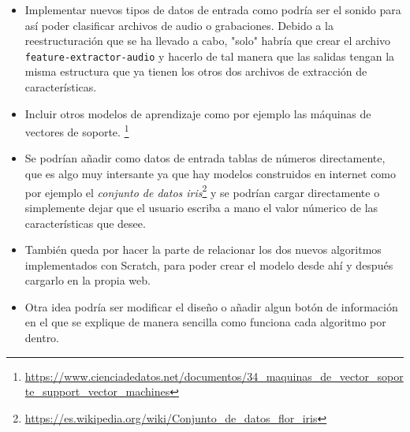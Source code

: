 \documentclass[a4paper, 12pt]{book}
\begin{document}
\begin{itemize}
  	\item  Implementar nuevos tipos de datos de entrada como podría ser el sonido para así poder clasificar archivos de audio o grabaciones. Debido a la reestructuración que se ha llevado a cabo, "solo" habría que crear el archivo \texttt{feature-extractor-audio} y hacerlo de tal manera que las salidas tengan la misma estructura que ya tienen los otros dos archivos de extracción de características.

	\item Incluir otros modelos de aprendizaje como por ejemplo las máquinas de vectores de soporte. \footnote{\url{https://www.cienciadedatos.net/documentos/34_maquinas_de_vector_soporte_support_vector_machines}}

	\item Se podrían añadir como datos de entrada tablas de números directamente, que es algo muy intersante ya que hay modelos construidos en internet como por ejemplo el \emph{conjunto de datos iris}\footnote{\url{https://es.wikipedia.org/wiki/Conjunto_de_datos_flor_iris}} y se podrían cargar directamente o simplemente dejar que el usuario escriba a mano el valor númerico de las características que desee. 

	\item También queda por hacer la parte de relacionar los dos nuevos algoritmos implementados con Scratch, para poder crear el modelo desde ahí y después cargarlo en la propia web. 

	\item Otra idea podría ser modificar el diseño o añadir algun botón de información en el que se explique de manera sencilla como funciona cada algoritmo por dentro.
\end{itemize}




\end{document}
